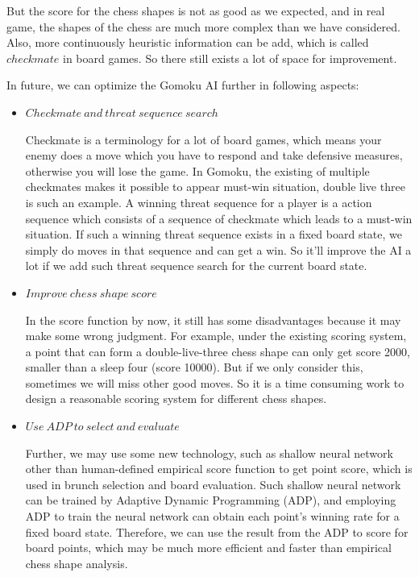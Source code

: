\documentclass[final]{cvpr}
\begin{document}
But the score for the chess shapes is not as good as we expected, and in real game, the shapes of the chess are much more complex than we have considered.
%
Also, more continuously heuristic information can be add, which is called $checkmate$ in board games.
%
So there still exists a lot of space for improvement.

In future, we can optimize the Gomoku AI further in following aspects:
\begin{itemize}
\item $Checkmate\ and \ threat\ sequence\ search$

\par Checkmate is a terminology for a lot of board games, which means your enemy does a move which you have to respond and take defensive measures, otherwise you will lose the game. 
%
In Gomoku, the existing of multiple checkmates makes it possible to appear must-win situation, double live three is such an example.
%
A winning threat sequence for a player is a action sequence which consists of a sequence of checkmate which leads to a must-win situation\cite{threat}.
%
If such a winning threat sequence exists in a fixed board state, we simply do moves in that sequence and can get a win.
%
So it'll improve the AI a lot if we add such threat sequence search for the current board state.
\item $Improve\ chess\ shape\ score$

\par In the score function by now, it still has some disadvantages because it may make some wrong judgment.
%
For example, under the existing scoring system, a point that can form a double-live-three chess shape can only get score 2000, smaller than a sleep four (score 10000).
%
But if we only consider this, sometimes we will miss other good moves.
%
So it is a time consuming work to design a reasonable scoring system for different chess shapes. 

\item $Use\ ADP\ to\ select\ and\ evaluate$
\par Further, we may use some new technology, such as shallow neural network other than human-defined empirical score function to get point score, which is used in brunch selection and board evaluation.
%
Such shallow neural network can be trained by Adaptive Dynamic Programming (ADP), and employing ADP to train the neural network can obtain each point's winning rate for a fixed board state.
%
Therefore, we can use the result from the ADP to score for board points, which may be much more efficient and faster than empirical chess shape analysis.
\end{itemize}


{\small


}
\end{document}
